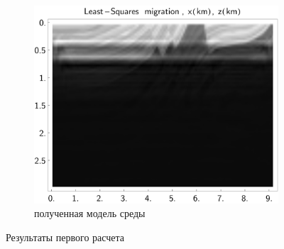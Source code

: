 \documentclass{article}
\begin{document}
\begin{figure}[tb]
\begin{subfigure}{.3333\textwidth}\includegraphics[width=\textwidth]{pic/report_april/zo_inv_toobad}\caption{полученная модель среды}\end{subfigure}%
\caption{Результаты первого расчета} \label{marmresult1}
\end{figure}
%
\end{document}
